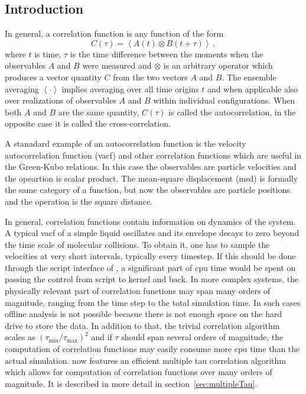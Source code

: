\subsection{Introduction}
In general, a correlation function is any function of the form
\begin{equation}
C(\tau) = \left<A\left(t\right) \otimes B\left(t+\tau\right)\right>\,,
\label{eq:CtauDef}
\end{equation}
where $t$ is time, $\tau$ is the time difference between the moments
when the observables $A$ and $B$ were measured and $\otimes$ is an
arbitrary operator which produces a vector quantity 
$C$ from the two vectors $A$ and $B$. The ensemble averaging $\left< \cdot \right>$
implies averaging over all time origins $t$ and when applicable also
over realizations of observables $A$ and $B$ within individual configurations.
When both $A$ and $B$ are
the same quantity, $C(\tau)$ is called the autocorrelation, 
in the opposite case it is called the cross-correlation.

A stanadard example of an autocorrelation function is the velocity
autocorrelation function (vacf) and other correlation functions
which are useful in the Green-Kubo relations. In this case the observables
are particle velocities and the opeartion is scalar product.
The mean-square displacement (msd) is formally the same category of
a function, but now the observables are particle positions and
the operation is the square distance. 

In general, correlation functions
contain information on dynamics of the system. A typical vacf of a 
simple liquid oscillates and its envelope decays to zero beyond the 
time scale of molecular collisions.
To obtain it, one has to sample the velocities at very short intervals,
typically every timestep. If this should be done through the script interface
of \es, a significant part of cpu time would be spent on passing the control
from script to kernel and back. In more complex systems, the physically relevant 
part of correlation functions may span many orders of magnitude, ranging
from the time step to the total simulation time. In such cases offline
analysis is not possible becasue there is not enough space on the hard
drive to store the data. In addition to that, the trivial correlation algorithm
scales as $(\tau_{\mathrm{min}}/\tau_{\mathrm{max}})^2$ and if $\tau$
should span several orders of magnitude, the computation of correlation
functions may easily consume more cpu time than the actual simulation.
\es now features an efficient multiple tau correlation algorithm which
allows for computation of correlation functions over many orders of magnitude.
It is described in more detail in section~\ref{sec:multipleTau}.

